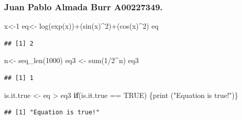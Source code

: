 \documentclass[12pt,halfline,a4paper,]{ouparticle}
\newenvironment{Shaded}{\begin{snugshade}}{\end{snugshade}}
\newcommand{\ConstantTok}[1]{\textcolor[rgb]{0.00,0.00,0.00}{#1}}
\newcommand{\ControlFlowTok}[1]{\textcolor[rgb]{0.13,0.29,0.53}{\textbf{#1}}}
\newcommand{\DecValTok}[1]{\textcolor[rgb]{0.00,0.00,0.81}{#1}}
\newcommand{\FunctionTok}[1]{\textcolor[rgb]{0.00,0.00,0.00}{#1}}
\newcommand{\NormalTok}[1]{#1}
\newcommand{\OtherTok}[1]{\textcolor[rgb]{0.56,0.35,0.01}{#1}}
\newcommand{\SpecialCharTok}[1]{\textcolor[rgb]{0.00,0.00,0.00}{#1}}
\newcommand{\StringTok}[1]{\textcolor[rgb]{0.31,0.60,0.02}{#1}}
\begin{document}
\hypertarget{juan-pablo-almada-burr-a00227349.}{%
\subsubsection{Juan Pablo Almada Burr
A00227349.}\label{juan-pablo-almada-burr-a00227349.}}

\begin{Shaded}
\begin{Highlighting}[]
\NormalTok{x}\OtherTok{\textless{}{-}}\DecValTok{1}
\NormalTok{eq}\OtherTok{\textless{}{-}} \FunctionTok{log}\NormalTok{(}\FunctionTok{exp}\NormalTok{(x))}\SpecialCharTok{+}\NormalTok{(}\FunctionTok{sin}\NormalTok{(x)}\SpecialCharTok{\^{}}\DecValTok{2}\NormalTok{)}\SpecialCharTok{+}\NormalTok{(}\FunctionTok{cos}\NormalTok{(x)}\SpecialCharTok{\^{}}\DecValTok{2}\NormalTok{) }
\NormalTok{eq}
\end{Highlighting}
\end{Shaded}

\begin{verbatim}
## [1] 2
\end{verbatim}

\begin{Shaded}
\begin{Highlighting}[]
\NormalTok{n}\OtherTok{\textless{}{-}} \FunctionTok{seq\_len}\NormalTok{(}\DecValTok{1000}\NormalTok{)}
\NormalTok{eq3 }\OtherTok{\textless{}{-}} \FunctionTok{sum}\NormalTok{(}\DecValTok{1}\SpecialCharTok{/}\DecValTok{2}\SpecialCharTok{\^{}}\NormalTok{n)}
\NormalTok{eq3}
\end{Highlighting}
\end{Shaded}

\begin{verbatim}
## [1] 1
\end{verbatim}

\begin{Shaded}
\begin{Highlighting}[]
\NormalTok{is.it.true }\OtherTok{\textless{}{-}}\NormalTok{ eq }\SpecialCharTok{\textgreater{}}\NormalTok{ eq3}
\ControlFlowTok{if}\NormalTok{(is.it.true }\SpecialCharTok{==} \ConstantTok{TRUE}\NormalTok{) \{}\FunctionTok{print}\NormalTok{ (}\StringTok{"Equation is true!"}\NormalTok{)\}}
\end{Highlighting}
\end{Shaded}

\begin{verbatim}
## [1] "Equation is true!"
\end{verbatim}
\end{document}
